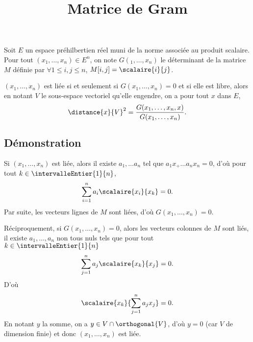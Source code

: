 \documentclass[fontsize=12pt,twoside=false,parskip=half]{scrartcl}
\title{Matrice de Gram}
\date{}
\author{}
\begin{document}
\maketitle
    Soit $E$ un espace préhilbertien réel muni de la norme associée au produit scalaire.
    Pour tout $(x_1, \ldots, x_n) \in E^n$, on note $G(_1, \ldots, x_n)$ le déterminant
    de la matrice $M$ définie par $\forall 1 \leq i, j \leq n$, $M[i, j] = \scalaire{i}{j}$.
   \begin{Theoreme}
      $(x_1, \ldots, x_n)$ est liée si et seulement si $G(x_1, \ldots, x_n) = 0$
      et si elle est libre, alors en notant $V$ le sous-espace vectoriel qu'elle
      engendre, on a pour tout $x$ dans $E$,
      \[
        \distance{x}{V}^2 = \frac{G(x_1, \ldots, x_n, x)}{G(x_1, \ldots, x_n)}.
      \]
   \end{Theoreme}
   \subsection{Démonstration}
      Si $(x_1, \ldots, x_n)$ est liée, alors il existe $a_1, \ldots a_n$ tel que
      $a_1 x_ + \ldots a_n x_n = 0$, d'où pour tout $k \in \intervalleEntier{1}{n}$,
      \[
        \sum_{i = 1}^{n} a_i \scalaire{x_i}{x_k} = 0.
      \]
      Par suite, les vecteurs lignes de $M$ sont liées, d'où $G(x_1, \ldots, x_n) = 0$.
      
      Réciproquement, si $G(x_1, \ldots, x_n) = 0$, alors les vecteurs colonnes de $M$
      sont liés, \ie{} il existe $a_1, \ldots, a_n$ non tous nuls tels que pour 
      tout $k \in \intervalleEntier{1}{n}$
      \[
        \sum_{j = 1}^{n} a_j \scalaire{x_k}{x_j} = 0.
      \]
      D'où
      \[
        \scalaire{x_k}{\sum_{j = 1}^{n} a_j x_j } = 0.
      \]
      En notant $y$ la somme, on a $y \in V \cap \orthogonal{V}$, 
      d'où $y = 0$ (car $V$ de dimension finie) et donc $(x_1, \ldots, x_n)$ est 
      liée. 
\end{document}
